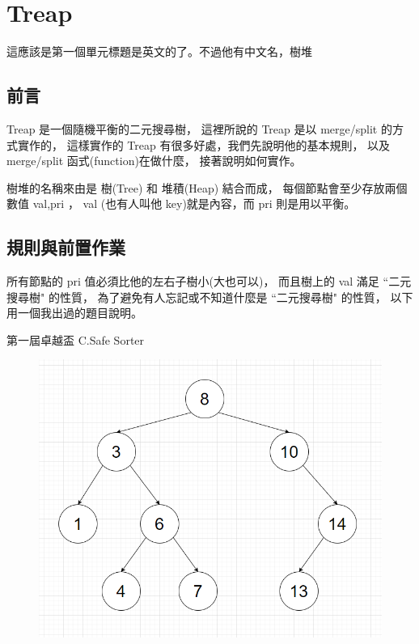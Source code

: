 \section{Treap}
    這應該是第一個單元標題是英文的了。不過他有中文名，樹堆

    \subsection{前言}

    Treap 是一個隨機平衡的二元搜尋樹，
    這裡所說的 Treap 是以 merge/split 的方式實作的，
    這樣實作的 Treap 有很多好處，我們先說明他的基本規則，
    以及 merge/split 函式(function)在做什麼，
    接著說明如何實作。

    樹堆的名稱來由是 樹(Tree) 和 堆積(Heap) 結合而成，
    每個節點會至少存放兩個數值 val,pri ，
     val (也有人叫他 key)就是內容，而 pri 則是用以平衡。
    
    \subsection{規則與前置作業}

    所有節點的 pri 值必須比他的左右子樹小(大也可以)，
    而且樹上的 val 滿足 ``二元搜尋樹" 的性質，
    為了避免有人忘記或不知道什麼是 ``二元搜尋樹" 的性質，
    以下用一個我出過的題目說明。

    \example 第一屆卓越盃 C.Safe Sorter

    \begin{figure}[!ht]
        \includegraphics[width=\textwidth]{../Images/SaveSorter.png}
    \end{figure}

